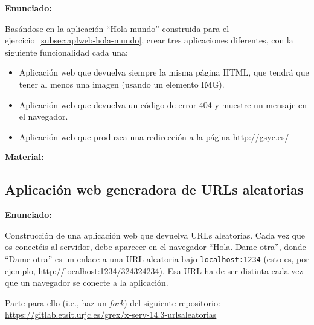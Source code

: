 \textbf{Enunciado:}

Basándose en la aplicación ``Hola mundo'' construida para el ejercicio~\ref{subsec:aplweb-hola-mundo}, crear tres aplicaciones diferentes, con la siguiente funcionalidad cada una:

\begin{itemize}
\item Aplicación web que devuelva siempre la misma página HTML, que tendrá que tener al menos una imagen (usando un elemento IMG).

\item Aplicación web que devuelva un código de error 404 y muestre un mensaje en el navegador.

\item Aplicación web que produzca una redirección a la página \url{http://gsyc.es/}
\end{itemize}

\textbf{Material:}



\subsection{Aplicación web generadora de URLs aleatorias}
\label{subsec:aplweb-urls-aleatorias}

\textbf{Enunciado:}

Construcción de una aplicación web que devuelva URLs aleatorias. Cada vez que os conectéis al servidor, debe aparecer en el navegador ``Hola. Dame otra'', donde ``Dame otra'' es un enlace a una URL aleatoria bajo \verb|localhost:1234| (esto es, por ejemplo, \url{http://localhost:1234/324324234}). Esa URL ha de ser distinta cada vez que un navegador se conecte a la aplicación.

Parte para ello (i.e., haz un \emph{fork}) del siguiente repositorio: \url{https://gitlab.etsit.urjc.es/grex/x-serv-14.3-urlsaleatorias}

